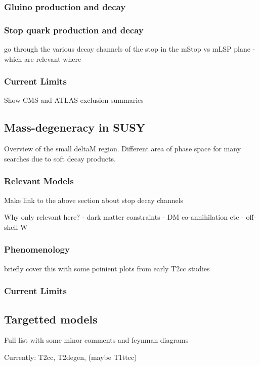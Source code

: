 \subsubsection{Gluino production and decay}
\subsubsection{Stop quark production and decay}
go through the various decay channels of the stop in the mStop vs mLSP plane
- which are relevant where
\subsubsection{Current Limits}
Show CMS and ATLAS exclusion summaries

\subsection{Mass-degeneracy in SUSY}
Overview of the small deltaM region. Different area of phase space for many searches due to soft decay 
products.
\subsubsection{Relevant Models}
Make link to the above section about stop decay channels

Why only relevant here?
- dark matter constraints - DM co-annihilation etc
- off-shell W

\subsubsection{Phenomenology}
briefly cover this with some poinient plots from early T2cc studies
\subsubsection{Current Limits}

\subsection{Targetted models}
Full list with some minor comments and feynman diagrams

Currently: T2cc, T2degen, (maybe T1ttcc)